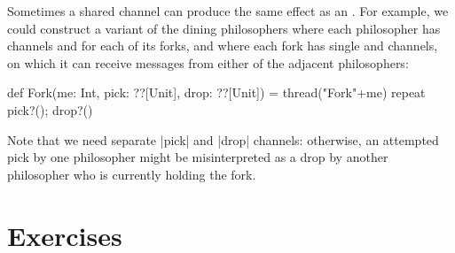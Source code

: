 Sometimes a shared channel can produce the same effect as an .  For
example, we could construct a variant of the dining philosophers where each
philosopher has channels  and  for each of its forks,
and where each fork has single  and  channels, on
which it can receive messages from either of the adjacent philosophers:
%
\begin{scala}
  def Fork(me: Int, pick: ??[Unit], drop: ??[Unit]) = thread("Fork"+me){
    repeat{ pick?(); drop?() }
  }
\end{scala}
%
Note that we need separate |pick| and |drop| channels: otherwise, an attempted
pick by one philosopher might be misinterpreted as a drop by another
philosopher who is currently holding the fork. 


\section*{Exercises}
 



